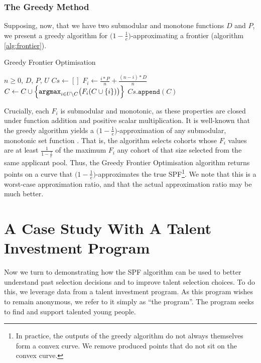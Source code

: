 \subsubsection{The Greedy Method}
Supposing, now, that we have two submodular and monotone functions $D$ and $P$, we present a greedy algorithm for $\bigl( 1-\frac{1}{e} \bigr)$-approximating a frontier (algorithm \ref{alg:frontier}).

\begin{algorithm}
    \caption{Greedy Frontier Optimisation}\label{alg:frontier}
    \begin{algorithmic}
        \Require $n \geq 0$, $D$, $P$, $U$
        \State $Cs \gets []$
            \State $F_i \gets \frac{i*P}{n}+\frac{(n-i)*D}{n}$
                \State $C \gets C \cup \Bigl\{ \texttt{argmax}_{i \in U \setminus C}\bigl(F_i(C \cup \{i\} ) \bigr) \Bigr\}$
            \EndWhile
            \State $Cs.\texttt{append}(C)$
        \EndFor
    \end{algorithmic}
\end{algorithm}

Crucially, each $F_i$ is submodular and monotonic, as these properties are closed under function addition and positive scalar multiplication. It is well-known that the greedy algorithm yields a $\bigl( 1-\frac{1}{e} \bigr)$-approximation of any submodular, monotonic set function \cite{bordeaux_submodular_2014}. That is, the algorithm selects cohorts whose $F_i$ values are at least $\frac{1}{1-\frac{1}{e}}$ of the maximum $F_i$ any cohort of that size selected from the same applicant pool. Thus, the Greedy Frontier Optimisation algorithm returns points on a curve that $\bigl( 1-\frac{1}{e} \bigr)$-approximates the true SPF\footnote{In practice, the outputs of the greedy algorithm do not always themselves form a convex curve. We remove produced points that do not sit on the convex curve.}. We note that this is a worst-case approximation ratio, and that the actual approximation ratio may be much better.

\section{A Case Study With A Talent Investment Program}\label{sec:case}

Now we turn to demonstrating how the SPF algorithm can be used to better understand past selection decisions and to improve talent selection choices. To do this, we leverage data from a talent investment program. As this program wishes to remain anonymous, we refer to it simply as ``the program''. The program seeks to find and support talented young people.

